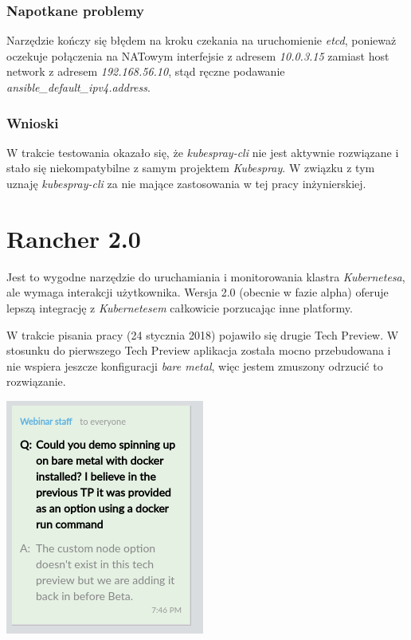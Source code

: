 \documentclass[a4paper,12pt,twoside,openany]{report}
\begin{document}
\hypertarget{napotkane-problemy}{%
\subsubsection{Napotkane problemy}\label{napotkane-problemy}}

Narzędzie kończy się błędem na kroku czekania na uruchomienie
\emph{etcd}, ponieważ oczekuje połączenia na NATowym interfejsie z
adresem \emph{10.0.3.15} zamiast host network z adresem
\emph{192.168.56.10}, stąd ręczne podawanie
\emph{ansible\_default\_ipv4.address}.

\hypertarget{wnioski-1}{%
\subsubsection{Wnioski}\label{wnioski-1}}

W trakcie testowania okazało się, że \emph{kubespray-cli} nie jest
aktywnie rozwiązane i stało się niekompatybilne z samym projektem
\emph{Kubespray}. W związku z tym uznaję \emph{kubespray-cli} za nie
mające zastosowania w tej pracy inżynierskiej.

\hypertarget{rancher-kubernetes}{%
\section{Rancher 2.0}\label{rancher-kubernetes}}

Jest to wygodne narzędzie do uruchamiania i monitorowania klastra
\emph{Kubernetesa}, ale wymaga interakcji użytkownika. Wersja 2.0
(obecnie w fazie alpha) oferuje lepszą integrację z \emph{Kubernetesem}
całkowicie porzucając inne platformy.

W trakcie pisania pracy (24 stycznia 2018) pojawiło się drugie Tech
Preview. W stosunku do pierwszego Tech Preview aplikacja została mocno
przebudowana i nie wspiera jeszcze konfiguracji \emph{bare metal}, więc
jestem zmuszony odrzucić to rozwiązanie.

\includegraphics{assets/rancher-tp2-baremetal.png}\\
\end{document}
